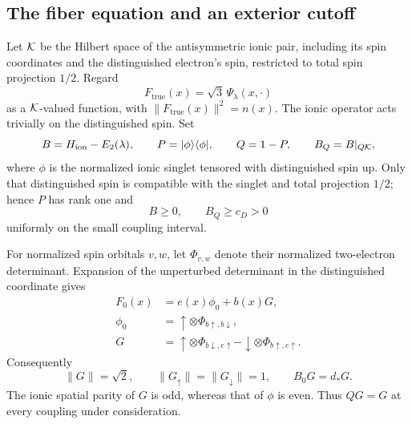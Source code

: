 \subsection{The fiber equation and an exterior cutoff}

Let \(\mathcal K\) be the Hilbert space of the antisymmetric ionic pair,
including its spin coordinates and the distinguished electron's spin,
restricted to total spin projection \(1/2\).  Regard
\[
 F_{\mathrm{true}}(x)=\sqrt3\,\Psi_\lambda(x,\cdot)
\]
as a \(\mathcal K\)-valued function, with \(\|F_{\mathrm{true}}(x)\|^2=n(x)\).
The ionic operator acts trivially on the distinguished spin.  Set
\[
 B=H_{\mathrm{ion}}-E_2(\lambda),\qquad
 P=|\phi\rangle\langle\phi|,\qquad Q=1-P,\qquad B_Q=B|_{Q\mathcal K},
\]
where \(\phi\) is the normalized ionic singlet tensored with distinguished
spin up.  Only that distinguished spin is compatible with the singlet
and total projection \(1/2\); hence \(P\) has rank one and
\begin{equation}
 B\geq0,\qquad B_Q\geq c_D>0
 \label{eq:ionic-gap}
\end{equation}
uniformly on the small coupling interval.

For normalized spin orbitals \(v,w\), let \(\Phi_{v,w}\) denote their
normalized two-electron determinant.  Expansion of the unperturbed
determinant in the distinguished coordinate gives
\begin{equation}
 \begin{split}
 F_0(x)&=e(x)\phi_0+b(x)G,\\
 \phi_0&=\uparrow\otimes\Phi_{b\uparrow,b\downarrow},\\
 G&=\uparrow\otimes\Phi_{b\downarrow,e\uparrow}
       -\downarrow\otimes\Phi_{b\uparrow,e\uparrow}.
 \end{split}
 \label{eq:unperturbed-fibers}
\end{equation}
Consequently
\begin{equation}
 \|G\|=\sqrt2,\qquad
 \|G_\uparrow\|=\|G_\downarrow\|=1,\qquad B_0G=d_*G.
 \label{eq:core-spin-components}
\end{equation}
The ionic spatial parity of \(G\) is odd, whereas that of \(\phi\) is
even.  Thus \(QG=G\) at every coupling under consideration.

